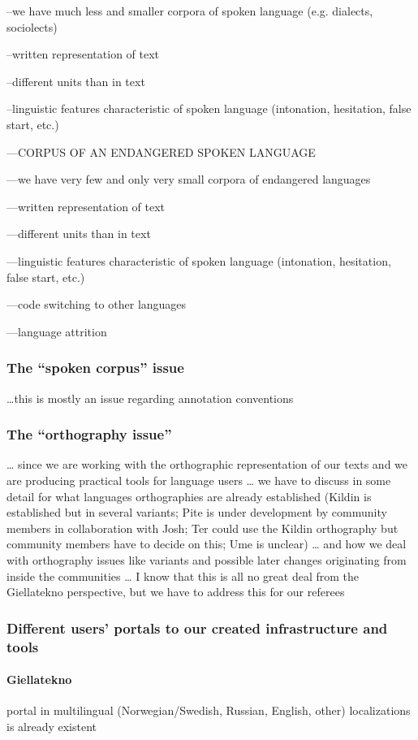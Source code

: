 \documentclass[a4paper,12pt]{article}
\begin{document}
--we have much less and smaller corpora of spoken language (e.g. dialects, sociolects)

--written representation of text

--different units than in text

--linguistic features characteristic of spoken language (intonation, hesitation, false start, etc.)

---CORPUS OF AN ENDANGERED SPOKEN LANGUAGE

---we have very few and only very small corpora of endangered languages

---written representation of text

---different units than in text

---linguistic features characteristic of spoken language (intonation, hesitation, false start, etc.)

---code switching to other languages

---language attrition

\subsubsection{The “spoken corpus” issue}
…this is mostly an issue regarding annotation conventions

\subsubsection{The “orthography issue”}
… since we are working with the orthographic representation of our texts and we are producing practical tools for language users … we have to discuss in some detail for what languages orthographies are already established (Kildin is established but in several variants; Pite is under development by community members in collaboration with Josh; Ter could use the Kildin orthography but community members have to decide on this; Ume is unclear) … and how we deal with orthography issues like variants and possible later changes originating from inside the communities … I know that this is all no great deal from the Giellatekno perspective, but we have to address this for our referees 

\subsubsection{Different users' portals to our created infrastructure and tools}

\paragraph{Giellatekno} portal in multilingual (Norwegian/Swedish, Russian, English, other) localizations is already existent
\end{document}
